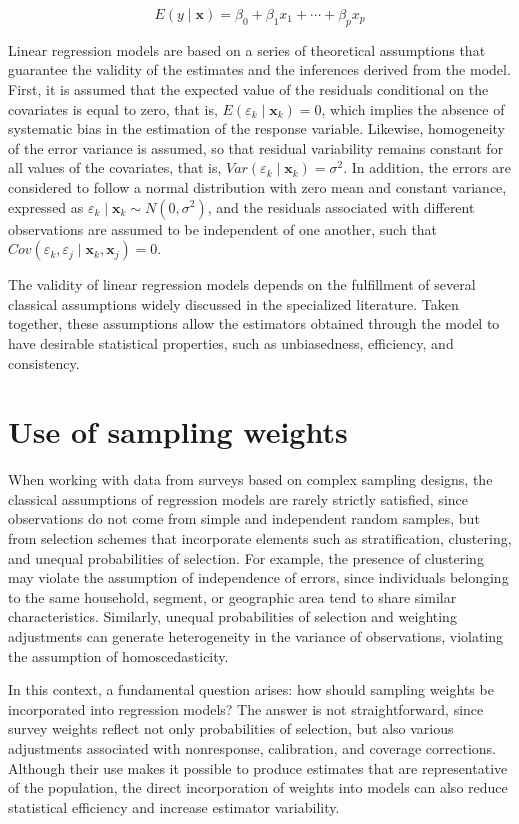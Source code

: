 \documentclass[
  english,
  12pt,
]{book}
\begin{document}
\[
E(y \mid \mathbf{x}) = {\beta}_{0} + {\beta}_{1}x_{1} + \cdots + {\beta}_{p}x_{p}
\]

Linear regression models are based on a series of theoretical assumptions that guarantee the validity of the estimates and the inferences derived from the model. First, it is assumed that the expected value of the residuals conditional on the covariates is equal to zero, that is, \(E(\varepsilon_{k} \mid \mathbf{x}_{k}) = 0\), which implies the absence of systematic bias in the estimation of the response variable. Likewise, homogeneity of the error variance is assumed, so that residual variability remains constant for all values of the covariates, that is, \(Var(\varepsilon_{k} \mid \mathbf{x}_{k}) = \sigma^2\). In addition, the errors are considered to follow a normal distribution with zero mean and constant variance, expressed as \(\varepsilon_{k} \mid \mathbf{x}_{k} \sim N(0,\sigma^2)\), and the residuals associated with different observations are assumed to be independent of one another, such that \(Cov(\varepsilon_{k},\varepsilon_{j}\mid \mathbf{x}_{k},\mathbf{x}_{j})=0\).

The validity of linear regression models depends on the fulfillment of several classical assumptions widely discussed in the specialized literature. Taken together, these assumptions allow the estimators obtained through the model to have desirable statistical properties, such as unbiasedness, efficiency, and consistency.

\section{Use of sampling weights}\label{uso-de-los-pesos-de-muestreo}

When working with data from surveys based on complex sampling designs, the classical assumptions of regression models are rarely strictly satisfied, since observations do not come from simple and independent random samples, but from selection schemes that incorporate elements such as stratification, clustering, and unequal probabilities of selection. For example, the presence of clustering may violate the assumption of independence of errors, since individuals belonging to the same household, segment, or geographic area tend to share similar characteristics. Similarly, unequal probabilities of selection and weighting adjustments can generate heterogeneity in the variance of observations, violating the assumption of homoscedasticity.

In this context, a fundamental question arises: how should sampling weights be incorporated into regression models? The answer is not straightforward, since survey weights reflect not only probabilities of selection, but also various adjustments associated with nonresponse, calibration, and coverage corrections. Although their use makes it possible to produce estimates that are representative of the population, the direct incorporation of weights into models can also reduce statistical efficiency and increase estimator variability.
\end{document}
